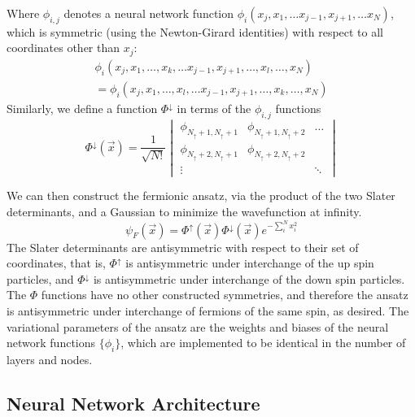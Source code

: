 \documentclass
[amsmath,10pt,aps,preprintnumbers,onecolumn,groupedaddress,superscriptaddress,notitlepage,nofootinbib,prd]{revtex4-1}
\begin{document}
Where $\phi_{i,j}$ denotes a neural network function  $\phi_i\left(x_j, x_1,\dots x_{j-1}, x_{j+1}, \dots x_N\right)$, which is symmetric (using the Newton-Girard identities)
with respect to all coordinates other than $x_j$:
\begin{equation}
	\begin{split}
	\phi_i \left(x_j, x_1,\dots, x_k,\dots x_{j-1}, x_{j+1}, \dots, x_l,\dots,x_N\right)
	\\= \phi_i \left(x_j, x_1,\dots, x_l,\dots x_{j-1}, x_{j+1}, \dots, x_k,\dots,x_N\right)
	\end{split}
\end{equation}
Similarly, we define a function $\Phi^\downarrow$ in terms of the $\phi_{i,j}$ functions
\begin{equation}
\Phi^\downarrow\left(\vec{x}\right) = \frac{1}{\sqrt{N!}}\begin{vmatrix}
	\phi_{N_\uparrow+1, N_\uparrow+1} & \phi_{N_\uparrow+1, N_\uparrow + 2} & \dots \\ 
	\phi_{N_\uparrow + 2, N_\uparrow + 1} & \phi_{N_\uparrow + 2, N_\uparrow+2} \\ 
	\vdots &  & \ddots
\end{vmatrix}	
\end{equation}

We can then construct the fermionic ansatz, via the product of the two Slater determinants, and a Gaussian to minimize the wavefunction at infinity.
\begin{equation}
	\psi_F \left(\vec{x}\right) = \Phi^\uparrow\left(\vec{x}\right) \Phi^\downarrow\left(\vec{x}\right) e^{-\sum_{i}^N x_i^2}
\end{equation}
The Slater determinants are antisymmetric with respect to their set of coordinates, that is, $\Phi^\uparrow$ is antisymmetric under interchange of the up spin particles, and
$\Phi^\downarrow$ is antisymmetric under interchange of the down spin particles. The  $\Phi$ functions have no other constructed symmetries, and therefore the ansatz is
antisymmetric under interchange of fermions of the same spin, as desired. The variational parameters of the ansatz are the weights and biases of the neural network functions $\{\phi_{i}\}$, which are implemented to be identical in the number of layers and nodes.

\subsection{Neural Network Architecture}
\end{document}
